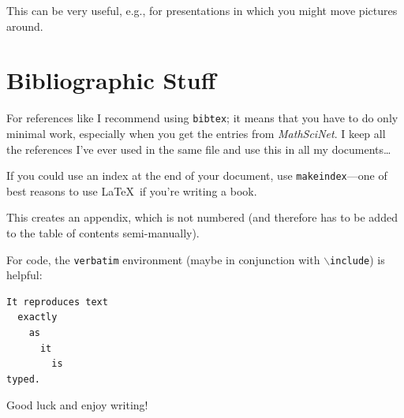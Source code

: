 \vspace{.5in}
\noindent
This can be very useful, e.g., for presentations in which you might move pictures around.


\section{Bibliographic Stuff}

For references like \cite[Section 2]{athanasiadismagic} I recommend using {\tt bibtex}; it means that you have to do only minimal work, especially when you get the entries
from \emph{MathSciNet}. I keep all the references I've ever used in the same file and use this in all my documents\dots

If you could use an index at the end of your document, use {\tt makeindex}---one of best reasons to use \LaTeX \ if you're writing a book.






This creates an appendix, which is not numbered (and therefore has to be added to the table of contents semi-manually).

For code, the {\tt verbatim} environment (maybe in conjunction with $\backslash${\tt include}) is helpful:

\begin{verbatim}
It reproduces text
  exactly
    as
      it
        is
typed.
\end{verbatim}

Good luck and enjoy writing!

